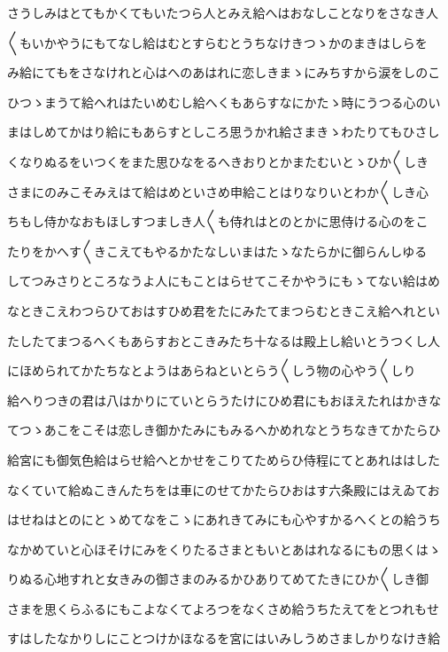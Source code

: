 \documentclass[a4paper,11pt,landscape]{ltjtarticle}
\begin{document}
さうしみはとてもかくてもいたつら人とみえ給へはおなしことなりをさなき人
\par\medskip
〱もいかやうにもてなし給はむとすらむとうちなけきつゝかのまきはしらを
\par\medskip
み給にてもをさなけれと心はへのあはれに恋しきまゝにみちすから涙をしのこ
\par\medskip
ひつゝまうて給へれはたいめむし給へくもあらすなにかたゝ時にうつる心のい
\par\medskip
まはしめてかはり給にもあらすとしころ思うかれ給さまきゝわたりてもひさし
\par\medskip
くなりぬるをいつくをまた思ひなをるへきおりとかまたむいとゝひか〱しき
\par\medskip
さまにのみこそみえはて給はめといさめ申給ことはりなりいとわか〱しき心
\par\medskip
ちもし侍かなおもほしすつましき人〱も侍れはとのとかに思侍ける心のをこ
\par\medskip
たりをかへす〱きこえてもやるかたなしいまはたゝなたらかに御らんしゆる
\par\medskip
してつみさりところなうよ人にもことはらせてこそかやうにもゝてない給はめ
\par\medskip
なときこえわつらひておはすひめ君をたにみたてまつらむときこえ給へれとい
\par\medskip
たしたてまつるへくもあらすおとこきみたち十なるは殿上し給いとうつくし人
\par\medskip
にほめられてかたちなとようはあらねといとらう〱しう物の心やう〱しり
\par\medskip
給へりつきの君は八はかりにていとらうたけにひめ君にもおほえたれはかきな
\par\medskip
てつゝあこをこそは恋しき御かたみにもみるへかめれなとうちなきてかたらひ
\par\medskip
給宮にも御気色給はらせ給へとかせをこりてためらひ侍程にてとあれははした
\par\medskip
なくていて給ぬこきんたちをは車にのせてかたらひおはす六条殿にはえゐてお
\par\medskip
はせねはとのにとゝめてなをこゝにあれきてみにも心やすかるへくとの給うち
\par\medskip
なかめていと心ほそけにみをくりたるさまともいとあはれなるにもの思くはゝ
\par\medskip
りぬる心地すれと女きみの御さまのみるかひありてめてたきにひか〱しき御
\par\medskip
さまを思くらふるにもこよなくてよろつをなくさめ給うちたえてをとつれもせ
\par\medskip
すはしたなかりしにことつけかほなるを宮にはいみしうめさましかりなけき給
\end{document}
